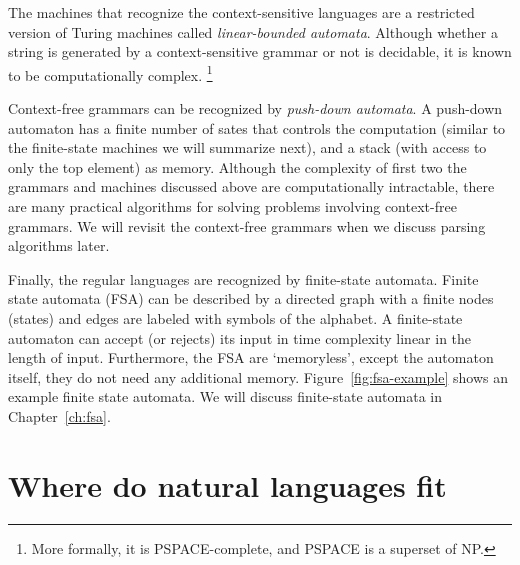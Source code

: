 The machines that recognize the context-sensitive languages
are a restricted version of Turing machines
called \emph{linear-bounded automata}.
Although whether a string is generated by a context-sensitive grammar
or not is decidable,
it is known to be computationally complex.%
\footnote{More formally,
  it is PSPACE-complete, and PSPACE is a superset of NP.
}

Context-free grammars can be recognized by \emph{push-down automata}.
A push-down automaton has a finite number of sates that controls
the computation
(similar to the finite-state machines we will summarize next),
and a stack (with access to only the top element) as memory.
Although the complexity of first two
the grammars and machines discussed above are computationally intractable,
there are many practical algorithms for solving problems
involving context-free grammars.
We will revisit the context-free grammars
when we discuss parsing algorithms later.

\begin{marginfigure}
  \begin{center}
  \end{center}
  \caption{\label{fig:fsa-example}%
    An example automata recognizing the strings over alphabet
    $\{a, b, c\}$ which begins with $a$, followed by zero or more
    $b$s, and ends with $c$.
  }
\end{marginfigure}
Finally, the regular languages are recognized by finite-state automata.
Finite state automata (FSA) can be described by a directed graph
with a finite nodes (states) and edges are
labeled with symbols of the alphabet.
A finite-state automaton
can accept (or rejects) its input in time complexity
linear in the length of input.
Furthermore, the FSA are `memoryless',
except the automaton itself, they do not need any additional memory.
Figure~\ref{fig:fsa-example} shows an example finite state automata.
We will discuss finite-state automata in Chapter~\ref{ch:fsa}.

\section{Where do natural languages fit}

